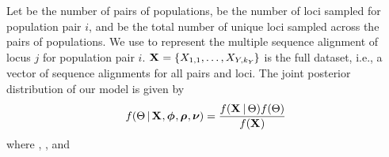 \documentclass[letterpaper,12pt]{article}
\begin{document}
\begin{linenumbers}
\begin{linenomath}
    Let \npairs{} be the number of pairs of populations,  be the
    number of loci sampled for population pair $i$,
    and \nlociTotal be the total number of unique loci sampled across the
    \npairs{} pairs of populations.
    We use  to represent the multiple sequence alignment of
    locus $j$ for population pair $i$.
    $\alignmentVector = \taxonLocusVector{\alignment}$ is the full dataset,
    i.e., a vector of sequence alignments for all pairs and loci.
    The joint posterior distribution of our model is given by
\begin{equation}
    f(\model{} \given \alignmentVector, \hkyModelVector, \ploidyScalarVector,
    \mutationRateScalarConstantVector) =
    \frac{f(\alignmentVector \given \model{}) f(\model{})}{
        f(\alignmentVector)}
    \label{eq:fullModelShort}
\end{equation}
where \hkyModelVector, \ploidyScalarVector, and \mutationRateScalarConstantVector

\end{linenomath}
\end{linenumbers}
\end{document}
